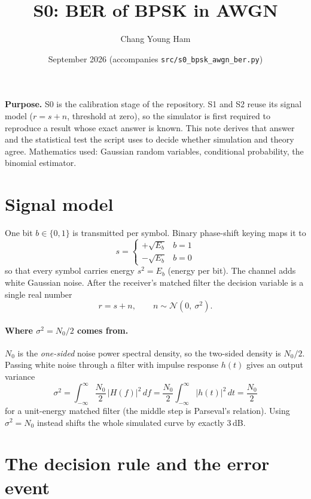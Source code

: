 \documentclass[11pt,a4paper]{article}
\title{S0: BER of BPSK in AWGN}
\author{Chang Young Ham}
\date{September 2026 \quad (accompanies \texttt{src/s0\_bpsk\_awgn\_ber.py})}
\begin{document}
\maketitle

\noindent\textbf{Purpose.}
S0 is the calibration stage of the repository. S1 and S2 reuse its signal model
($r=s+n$, threshold at zero), so the simulator is first required to reproduce a
result whose exact answer is known. This note derives that answer and the
statistical test the script uses to decide whether simulation and theory agree. Mathematics used: Gaussian
random variables, conditional probability, the binomial estimator.

\section{Signal model}

One bit $b\in\{0,1\}$ is transmitted per symbol. Binary phase-shift keying maps it to
\[
  s = \begin{cases} +\sqrt{E_b} & b=1 \\ -\sqrt{E_b} & b=0 \end{cases}
\]
so that every symbol carries energy $s^2 = E_b$ (energy per bit).
The channel adds white Gaussian noise. After the receiver's matched filter the
decision variable is a single real number
\[
  r = s + n, \qquad n \sim \mathcal N\!\left(0,\ \sigma^2\right).
\]

\paragraph{Where $\sigma^2 = N_0/2$ comes from.}
$N_0$ is the \emph{one-sided} noise power spectral density, so the two-sided
density is $N_0/2$. Passing white noise through a filter with impulse response
$h(t)$ gives an output variance
\[
  \sigma^2 = \int_{-\infty}^{\infty}\frac{N_0}{2}\,|H(f)|^2\,df
           = \frac{N_0}{2}\int_{-\infty}^{\infty}|h(t)|^2\,dt
           = \frac{N_0}{2}
\]
for a unit-energy matched filter (the middle step is Parseval's relation).
Using $\sigma^2=N_0$ instead shifts the whole simulated curve by exactly 3\,dB.

\section{The decision rule and the error event}
\end{document}
